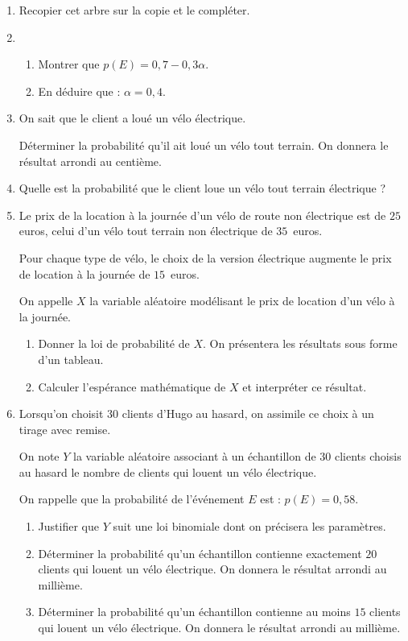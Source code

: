 \documentclass[11pt]{article}
\begin{document}
\medskip

\begin{enumerate}
\item Recopier cet arbre sur la copie et le compléter.
\item 
	\begin{enumerate}
		\item Montrer que $p(E) = 0,7 - 0,3\alpha$.
		\item En déduire que : $\alpha = 0,4$.
	\end{enumerate}
\item On sait que le client a loué un vélo électrique. 

Déterminer la probabilité qu'il ait loué un vélo tout terrain. On donnera le résultat arrondi au centième.
\item Quelle est la probabilité que le client loue un vélo tout terrain électrique ?
\item Le prix de la location à la journée d'un vélo de route non électrique est de $25$ euros, celui d'un vélo tout terrain non électrique de $35$~euros. 

Pour chaque type de vélo, le choix de la version électrique augmente le prix de location à la journée de $15$~euros. 

On appelle $X$ la variable aléatoire modélisant le prix de location d'un vélo à la journée. 
	\begin{enumerate}
		\item Donner la loi de probabilité de $X$. On présentera les résultats sous forme d'un tableau.
		\item Calculer l'espérance mathématique de $X$ et interpréter ce résultat.
	\end{enumerate}	
\item Lorsqu'on choisit $30$ clients d'Hugo au hasard, on assimile ce choix à un tirage avec remise. 

On note $Y$ la variable aléatoire associant à un échantillon de 30 clients choisis au hasard le nombre de clients qui louent un vélo électrique.

On rappelle que la probabilité de l'événement $E$ est : $p(E) = 0,58$.
	\begin{enumerate}
		\item Justifier que $Y$ suit une loi binomiale dont on précisera les paramètres.
		\item Déterminer la probabilité qu'un échantillon contienne exactement $20$ clients qui louent un vélo électrique. On donnera le résultat arrondi au millième.
		\item Déterminer la probabilité qu'un échantillon contienne au moins $15$ clients qui louent un vélo électrique. On donnera le résultat arrondi au millième.
	\end{enumerate}
\end{enumerate}
\end{document}

